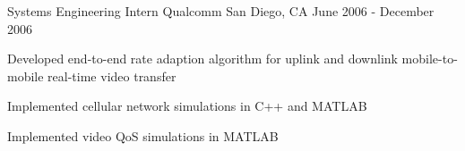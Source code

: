 \begin{cventries}
\cventry
{Systems Engineering Intern} %
{Qualcomm} %
{San Diego, CA} %
{June 2006 - December 2006} %
{
  \begin{cvitems} %
    \item {Developed end-to-end rate adaption algorithm for uplink and downlink mobile-to-mobile real-time video transfer}
    \item {Implemented cellular network simulations in C++ and MATLAB}
    \item {Implemented video QoS simulations in MATLAB}
  \end{cvitems}
}

\end{cventries}
